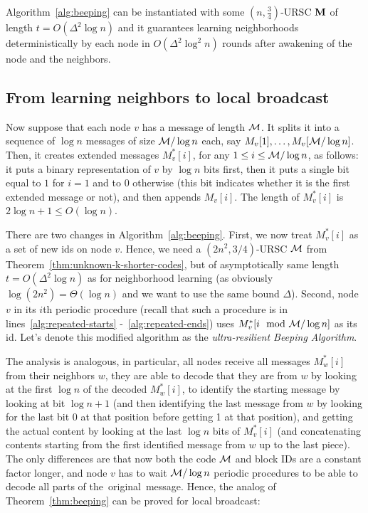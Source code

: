 \documentclass[11pt]{article}
\begin{document}
\begin{theorem}
\label{thm:beeping}
Algorithm~\ref{alg:beeping} can be instantiated with some $(n, \frac{3}{4})$-URSC ${\mathbf M}$ of length $t=O(\Delta^2\log n)$ and it guarantees learning  neighborhoods deterministically by each node in $O(\Delta^2\log^2 n)$ rounds after awakening of the node and the neighbors.
\end{theorem}



\subsection{From learning neighbors to local broadcast}

Now suppose that each node $v$ has a message of length ${\mathcal{M}}$. It splits it into a sequence of $\log n$ messages of size ${\mathcal{M}}/\log n$ each, say $M_v[1],\ldots,M_v[{\mathcal{M}}/\log n]$.
Then, it creates extended messages $M^*_v[i]$, for any $1\le i\le {\mathcal{M}}/\log n$, as follows: it puts a binary representation of $v$ by $\log n$ bits first, then it puts a single bit equal to $1$ for $i=1$ and to $0$ otherwise (this bit indicates whether it is the first extended message or not), and then appends $M_v[i]$. The length of $M^*_v[i]$ is $2\log n+1 \le O(\log n)$. 

There are two changes in Algorithm~\ref{alg:beeping}.
First, we now treat $M^*_v[i]$ as a set of new ids on node $v$.
Hence, we need a $(2n^2,3/4)$-URSC ${\mathcal{M}}$ from Theorem~\ref{thm:unknown-k-shorter-codes}, but of asymptotically same length $t=O(\Delta^2\log n)$ as for neighborhood learning (as obviously $\log(2n^2)=\Theta(\log n)$ and we want to use the same bound $\Delta$).
Second, node $v$ in its $i$th periodic procedure (recall that such a procedure is in lines~\ref{alg:repeated-starts} -~\ref{alg:repeated-ends}) uses $M^*_v[i\mod {{\mathcal{M}}}/\log n]$ as its id.
Let's denote this modified algorithm as the \textit{ultra-resilient Beeping Algorithm}.

The analysis is analogous, in particular, all nodes receive all messages $M^*_w[i]$ from their neighbors $w$, they are able to decode that they are from $w$ by looking at the first $\log n$ of the decoded $M^*_w[i]$, to identify the starting message by looking at bit $\log n+1$ (and then identifying the last message from $w$ by looking for the last bit 0 at that position before getting 1 at that position), and getting the actual content by looking at the last $\log n$ bits of $M^*_v[i]$ (and concatenating contents starting from the first identified message from $w$ up to the last piece). The only differences are that now both the code ${\mathcal{M}}$ and block IDs are a constant factor longer, and node $v$ has to wait ${\mathcal{M}}/\log n$ periodic procedures to be able to decode all parts of the~original~message.
Hence, the analog of Theorem~\ref{thm:beeping} can be proved for local broadcast:
\end{document}
